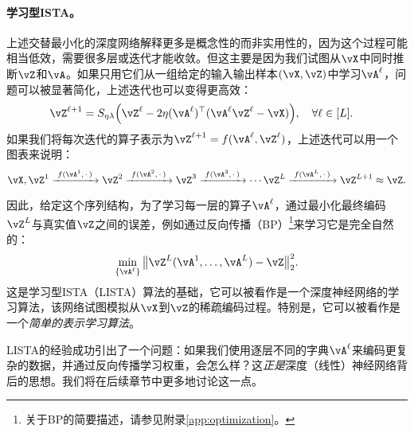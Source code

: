 \documentclass[../../book-main_zh.tex]{subfiles}
\begin{document}
\paragraph{学习型ISTA。} 上述交替最小化的深度网络解释更多是概念性的而非实用性的，因为这个过程可能相当低效，需要很多层或迭代才能收敛。但这主要是因为我们试图从\(\vX\)中同时推断\(\vZ\)和\(\vA\)。如果只用它们从一组给定的输入输出样本\((\vX, \vZ)\)中学习\(\vA^\ell\)，问题可以被显著简化，上述迭代也可以变得更高效：
\begin{align}
    & \vZ^{\ell + 1} = S_{\eta\lambda}\rp{\vZ^{\ell} - 2\eta(\vA^{\ell})^{\top}(\vA^\ell\vZ^{\ell} - \vX)}, \quad \forall \ell \in [L].
\end{align}
如果我们将每次迭代的算子表示为$\vZ^{\ell + 1} = f(\vA^\ell, \vZ^\ell)$，上述迭代可以用一个图表来说明：
\begin{equation*}
\vX, \vZ^1 \xrightarrow{\hspace{1mm} f(\vA^1,\,\cdot\,) \hspace{1mm}}  \vZ^2 \xrightarrow{\hspace{1mm} f(\vA^2,\,\cdot\,) \hspace{1mm}}  \vZ^3  \xrightarrow{\hspace{1mm} f(\vA^3,\,\cdot\,) \hspace{1mm}} \cdots \vZ^{L}  \xrightarrow{\hspace{1mm} f(\vA^{L},\,\cdot\,) \hspace{1mm}} \vZ^{L + 1} \approx \vZ.  
\label{eqn:deep-sparse-encoding}
\end{equation*}

因此，给定这个序列结构，为了学习每一层的算子\(\vA^\ell\)，通过最小化最终编码$\vZ^L$与真实值$\vZ$之间的误差，例如通过反向传播（BP）\footnote{关于BP的简要描述，请参见附录\ref{app:optimization}。}来学习它是完全自然的：
\begin{equation}
    \min_{\{\vA^\ell\}} \big\|\vZ^L(\vA^1, \ldots, \vA^{L}) - \vZ\big\|_2^2.
\end{equation}
这是学习型ISTA（LISTA）算法\cite{gregor2010learning}的基础，它可以被看作是一个深度神经网络的学习算法，该网络试图模拟从$\vX$到$\vZ$的稀疏编码过程。特别是，它可以被看作是一个\textit{简单的表示学习算法}。


LISTA的经验成功引出了一个问题：如果我们使用逐层不同的字典\(\vA^\ell\)来编码更复杂的数据，并通过反向传播学习权重，会怎么样？这\textit{正是}深度（线性）神经网络背后的思想。我们将在后续章节中更多地讨论这一点。

\end{document}
